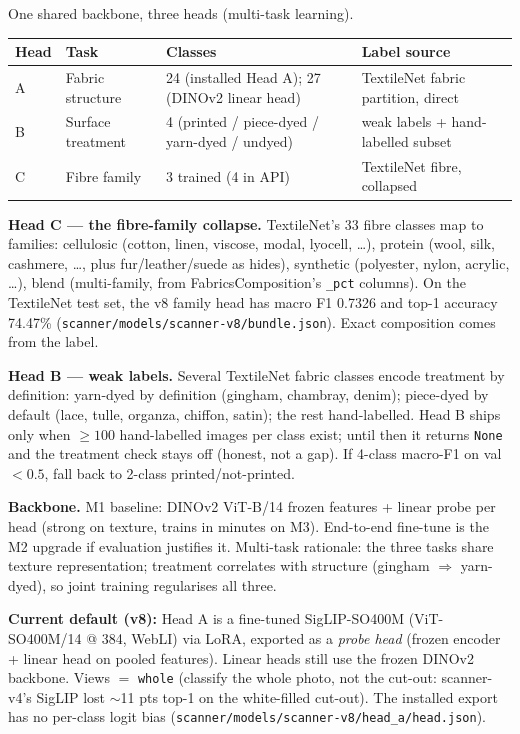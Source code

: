 \documentclass[11pt,a4paper]{article}
\begin{document}
One shared backbone, three heads (multi-task learning).

\begin{table}[h]
\centering
\begin{tabular}{llll}
\toprule
Head & Task & Classes & Label source \\
\midrule
A & Fabric structure & 24 (installed Head A); 27 (DINOv2 linear head) & TextileNet fabric partition, direct \\
B & Surface treatment & 4 (printed / piece-dyed / yarn-dyed / undyed) & weak labels + hand-labelled subset \\
C & Fibre family & 3 trained (4 in API) & TextileNet fibre, collapsed \\
\bottomrule
\end{tabular}
\end{table}

\textbf{Head C --- the fibre-family collapse.} TextileNet's 33 fibre classes map to
families: cellulosic (cotton, linen, viscose, modal, lyocell, \dots), protein
(wool, silk, cashmere, \dots, plus fur/leather/suede as hides), synthetic
(polyester, nylon, acrylic, \dots), blend (multi-family, from FabricsComposition's
        \texttt{\_pct} columns). On the TextileNet test set, the v8 family head has
        macro F1 0.7326 and top-1 accuracy 74.47\%
        (\texttt{scanner/models/scanner-v8/bundle.json}). Exact composition
comes from the label.

\textbf{Head B --- weak labels.} Several TextileNet fabric classes encode treatment
by definition: yarn-dyed by definition (gingham, chambray, denim); piece-dyed by
default (lace, tulle, organza, chiffon, satin); the rest hand-labelled. Head B
ships only when $\ge 100$ hand-labelled images per class exist; until then it
returns \texttt{None} and the treatment check stays off (honest, not a gap). If
4-class macro-F1 on val $<0.5$, fall back to 2-class printed/not-printed.

\textbf{Backbone.} M1 baseline: DINOv2 ViT-B/14 frozen features + linear probe per
head (strong on texture, trains in minutes on M3). End-to-end fine-tune is the M2
upgrade if evaluation justifies it. Multi-task rationale: the three tasks share
texture representation; treatment correlates with structure (gingham $\Rightarrow$
yarn-dyed), so joint training regularises all three.

\textbf{Current default (v8):} Head A is a fine-tuned SigLIP-SO400M (ViT-SO400M/14
@ 384, WebLI) via LoRA, exported as a \emph{probe head} (frozen encoder + linear
head on pooled features). Linear heads still use the frozen DINOv2 backbone. Views
$=$ \texttt{whole} (classify the whole photo, not the cut-out: scanner-v4's SigLIP
        lost $\sim$11 pts top-1 on the white-filled cut-out). The installed export has
        no per-class logit bias (\texttt{scanner/models/scanner-v8/head\_a/head.json}).
\end{document}
